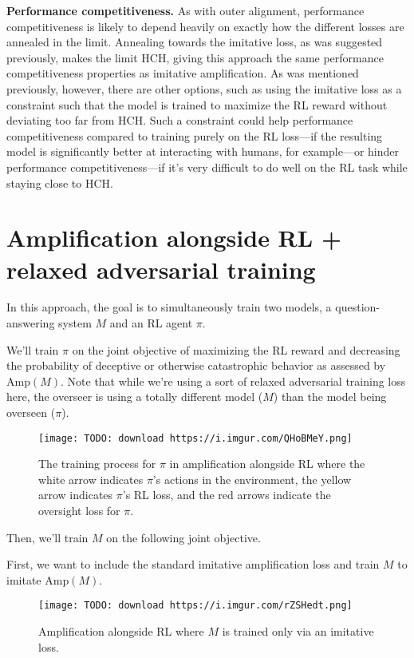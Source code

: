 \textbf{Performance competitiveness.} As with outer alignment, performance competitiveness is likely to depend heavily on exactly how the different losses are annealed in the limit. Annealing towards the imitative loss, as was suggested previously, makes the limit HCH, giving this approach the same performance competitiveness properties as imitative amplification. As was mentioned previously, however, there are other options, such as using the imitative loss as a constraint such that the model is trained to maximize the RL reward without deviating too far from HCH. Such a constraint could help performance competitiveness compared to training purely on the RL loss---if the resulting model is significantly better at interacting with humans, for example---or hinder performance competitiveness---if it's very difficult to do well on the RL task while staying close to HCH.

\section{Amplification alongside RL + relaxed adversarial training}
\label{sec:11}

In this approach, the goal is to simultaneously train two models, a question-answering system $M$ and an RL agent $\pi$.

We'll train $\pi$ on the joint objective of maximizing the RL reward and decreasing the probability of deceptive or otherwise catastrophic behavior as assessed by $\text{Amp}(M)$. Note that while we're using a sort of relaxed adversarial training loss here, the overseer is using a totally different model ($M$) than the model being overseen ($\pi$).

\begin{figure}[h!]
  \centering
  \texttt{[image: TODO: download https://i.imgur.com/QHoBMeY.png]}
  \caption{The training process for $\pi$ in amplification alongside RL where the white arrow indicates $\pi$'s actions in the environment, the yellow arrow indicates $\pi$'s RL loss, and the red arrows indicate the oversight loss for $\pi$.}
\end{figure}

Then, we'll train $M$ on the following joint objective.

First, we want to include the standard imitative amplification loss and train $M$ to imitate $\text{Amp}(M)$.

\begin{figure}[h!]
  \centering
  \texttt{[image: TODO: download https://i.imgur.com/rZSHedt.png]}
  \caption{Amplification alongside RL where $M$ is trained only via an imitative loss.}
\end{figure}

